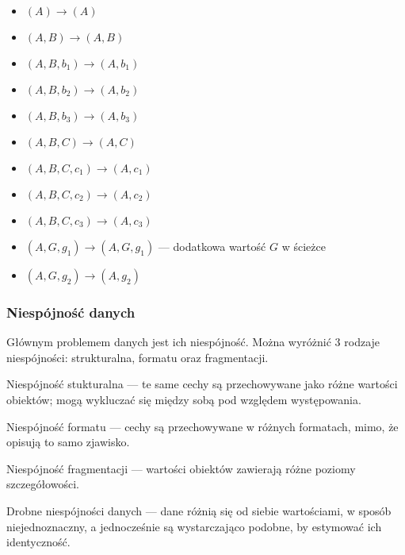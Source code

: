 \begin{itemize}
\item $(A) \to (A)$
\item $(A, B) \to (A, B)$
\item $(A, B, b_1) \to (A, b_1)$
\item $(A, B, b_2) \to (A, b_2)$
\item $(A, B, b_3) \to (A, b_3)$
\item $(A, B, C) \to (A, C)$
\item $(A, B, C, c_1) \to (A, c_1)$
\item $(A, B, C, c_2) \to (A, c_2)$
\item $(A, B, C, c_3) \to (A, c_3)$
\item $(A, G, g_1) \to (A, G, g_1)$ --- 
      dodatkowa wartość $G$ w ścieżce
\item $(A, G, g_2) \to (A, g_2)$
\end{itemize}



\subsubsection{Niespójność danych}

Głównym problemem danych jest ich niespójność. Można wyróżnić
3 rodzaje niespójności: strukturalna, formatu oraz fragmentacji.

\begin{defi}
Niespójność stukturalna --- te same cechy są przechowywane jako
różne wartości obiektów; mogą wykluczać się między sobą pod
względem występowania.
\label{def:niespójność-strukturalna}
\end{defi}

\begin{defi}
Niespójność formatu --- cechy są przechowywane w różnych formatach,
mimo, że opisują to samo zjawisko.
\label{def:niespójność-formatu}
\end{defi}

\begin{defi}
Niespójność fragmentacji --- wartości obiektów zawierają różne
poziomy szczegółowości.
\label{def:niespójność-fragmentacji}
\end{defi}

\begin{defi}
Drobne niespójności danych --- dane różnią się od siebie wartościami,
w sposób niejednoznaczny, a jednocześnie są wystarczająco podobne,
by estymować ich identyczność.
\label{def:drobne-niespójności}
\end{defi}

